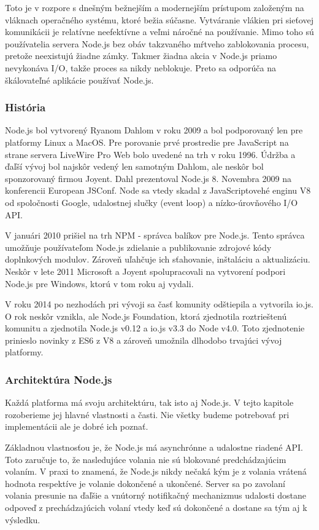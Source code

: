 \indent Toto je v rozpore s dnešným bežnejším a modernejším prístupom založeným na vláknach operačného systému, ktoré bežia súčasne. Vytváranie vlákien pri sieťovej komunikácii je relatívne neefektívne a veľmi náročné na používanie. Mimo toho sú používatelia servera Node.js bez obáv takzvaného mŕtveho zablokovania procesu, pretože neexistujú žiadne zámky. Takmer žiadna akcia v Node.js priamo nevykonáva I/O, takže proces sa nikdy neblokuje. Preto sa odporúča na škálovateľné aplikácie používať Node.js.

\subsubsection{História}
\indent Node.js bol vytvorený Ryanom Dahlom v roku 2009 a bol podporovaný len pre platformy Linux a MacOS. Pre porovanie prvé prostredie pre JavaScript na strane servera LiveWire Pro Web bolo uvedené na trh v roku 1996. Údržba a ďaľší vývoj bol najskôr vedený len samotným Dahlom, ale neskôr bol sponzorovaný firmou Joyent. Dahl prezentoval Node.js 8. Novembra 2009 na konferencii European JSConf. Node sa vtedy skadal z JavaScriptovehé enginu V8 od spoločnosti Google, udalostnej slučky (event loop) a nízko-úrovňového I/O API.

\indent V januári 2010 prišiel na trh NPM - správca balíkov pre Node.js. Tento správca umožňuje používateľom Node.js zdielanie a publikovanie zdrojové kódy doplnkových modulov. Zároveň uľahčuje ich sťahovanie, inštaláciu a aktualizáciu. Neskôr v lete 2011 Microsoft a Joyent spolupracovali na vytvorení podpori Node.js pre Windows, ktorú v tom roku aj vydali. 

\indent V roku 2014 po nezhodách pri vývoji sa časť komunity odštiepila a vytvorila io.js. O rok neskôr vznikla, ale Node.js Foundation, ktorá zjednotila roztrieštenú komunitu a zjednotila Node.js v0.12 a io.js v3.3 do Node v4.0. Toto zjednotenie prinieslo novinky z ES6 z V8 a zároveň umožnila dlhodobo trvajúci vývoj platformy.

\subsubsection{Architektúra Node.js}
\indent Každá platforma má svoju architektúru, tak isto aj Node.js. V tejto kapitole rozoberieme jej hlavné vlastnosti a časti. Nie všetky budeme potrebovať pri implementácii ale je dobré ich poznať.

\indent Základnou vlastnosťou je, že Node.js má asynchrónne a udalostne riadené API. Toto zaručuje to, že nasledujúce volania nie sú blokované predchádzajúcim volaním. V praxi to znamená, že Node.js nikdy nečaká kým je z volania vrátená hodnota respektíve je volanie dokončené a ukončené. Server sa po zavolaní volania presunie na ďaľšie a vnútorný notifikačný mechanizmus udalosti dostane odpoveď z prechádzajúcich volaní vtedy keď sú dokončené a dostane sa tým aj k výsledku. 

